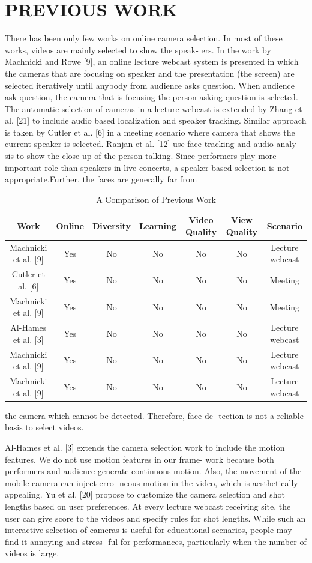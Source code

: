 \documentclass{sig-alternate-05-2015}
\begin{document}
\section{PREVIOUS WORK}
There has been only few works on online camera selection. In
most of these works, videos are mainly selected to show the speak-
ers. In the work by Machnicki and Rowe [9], an online lecture
webcast system is presented in which the cameras that are focusing
on speaker and the presentation (the screen) are selected iteratively
until anybody from audience asks question. When audience ask
question, the camera that is focusing the person asking question is
selected. The automatic selection of cameras in a lecture webcast
is extended by Zhang et al. [21] to include audio based localization
and speaker tracking. Similar approach is taken by Cutler et al. [6]
in a meeting scenario where camera that shows the current speaker
is selected. Ranjan et al. [12] use face tracking and audio analy-
sis to show the close-up of the person talking. Since performers
play more important role than speakers in live concerts, a speaker
based selection is not appropriate.Further, the faces are generally
far from\par
\begin{table}
\begin{center}
\caption{ A Comparison of Previous Work}
\begin{tabular}{|c|c|c|c|c|c|c|}
\hline
Work  & Online & Diversity& Learning & Video Quality & View Quality & Scenario\\
\hline
Machnicki et al. [9] & Yes & No& No& No& No& Lecture webcast\\
\hline
Cutler et al. [6] & Yes & No& No& No& No& Meeting\\
\hline
Machnicki et al. [9] & Yes & No& No& No& No& Meeting\\
\hline
Al-Hames et al. [3] & Yes & No& No& No& No& Lecture webcast\\
\hline
Machnicki et al. [9] & Yes & No& No& No& No& Lecture webcast\\
\hline
Machnicki et al. [9] & Yes & No& No& No& No& Lecture webcast\\
\hline
\end{tabular}
\end{center}
\end{table}
the camera which cannot be detected. Therefore, face de-
tection is not a reliable basis to select videos.

Al-Hames et al. [3] extends the camera selection work to include
the motion features. We do not use motion features in our frame-
work because both performers and audience generate continuous
motion. Also, the movement of the mobile camera can inject erro-
neous motion in the video, which is aesthetically appealing. Yu et
al. [20] propose to customize the camera selection and shot lengths
based on user preferences. At every lecture webcast receiving site,
the user can give score to the videos and specify rules for shot
lengths. While such an interactive selection of cameras is useful
for educational scenarios, people may find it annoying and stress-
ful for performances, particularly when the number of videos is
large.
\end{document}
